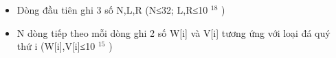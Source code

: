 \begin{itemize}
	\item     Dòng đầu tiên ghi 3 số N,L,R (N≤32; L,R≤10    $^     18    $    )   
	\item     N dòng tiếp theo mỗi dòng ghi 2 số W[i] và V[i] tương ứng với loại đá quý thứ i (W[i],V[i]≤10    $^     15    $    )   
\end{itemize}